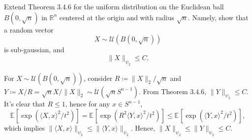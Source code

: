 \begin{problem*}[Exercise 3.4.7]\label{ex3.4.7}
	Extend Theorem 3.4.6 for the uniform distribution on the Euclidean ball \(B(0, \sqrt{n} )\) in \(\mathbb{R} ^n\) centered at the origin and with radius \(\sqrt{n} \). Namely, show that a random vector
	\[
		X \sim \mathcal{U} (B(0, \sqrt{n} ))
	\]
	is sub-gaussian, and
	\[
		\lVert X \rVert _{\psi _2}
		\leq C.
	\]
\end{problem*}
\begin{answer}
	For \(X \sim \mathcal{U} (B(0, \sqrt{n} ))\), consider \(R \coloneqq \lVert X \rVert _2 / \sqrt{n} \) and \(Y \coloneqq X / R = \sqrt{n} X / \lVert X \rVert _2 \sim \mathcal{U} (\sqrt{n} S^{n-1})\). From Theorem 3.4.6, \(\lVert Y \rVert _{\psi _2} \leq C\). It's clear that \(R \leq 1\), hence for any \(x\in S^{n-1}\),
	\[
		\mathbb{E}_{}[\exp (\langle X, x \rangle ^2 / t^2)]
		= \mathbb{E}_{}[\exp (R^2\langle Y, x \rangle ^2 / t^2)]
		\leq \mathbb{E}_{}[\exp (\langle Y, x \rangle ^2 / t^2)] ,
	\]
	which implies \(\lVert \langle X, x \rangle \rVert _{\psi _2} \leq \lVert \langle Y, x \rangle \rVert _{\psi _2}\). Hence, \(\lVert X \rVert _{\psi _2} \leq \lVert Y \rVert _{\psi _2} \leq C\).
\end{answer}

